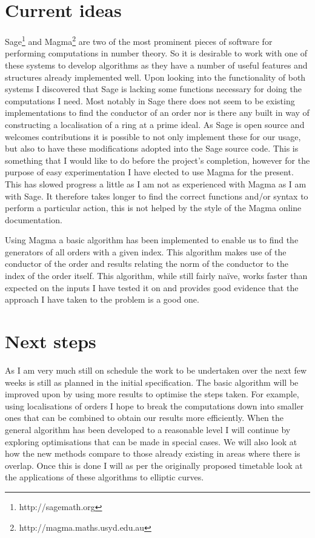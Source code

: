 \documentclass[11pt,a4paper]{article}
\begin{document}
\section*{Current ideas}
Sage\footnote{http://sagemath.org} and Magma\footnote{http://magma.maths.usyd.edu.au} are two of the most prominent pieces of software for performing computations in number theory.
So it is desirable to work with one of these systems to develop algorithms as they have a number of useful features and structures already implemented well.
Upon looking into the functionality of both systems I discovered that Sage is lacking some functions necessary for doing the computations I need.
Most notably in Sage there does not seem to be existing implementations to find the conductor of an order nor is there any built in way of constructing a localisation of a ring at a prime ideal.
As Sage is open source and welcomes contributions it is possible to not only implement these for our usage, but also to have these modifications adopted into the Sage source code.
This is something that I would like to do before the project's completion, however for the purpose of easy experimentation I have elected to use Magma for the present.
This has slowed progress a little as I am not as experienced with Magma as I am with Sage.
It therefore takes longer to find the correct functions and/or syntax to perform a particular action, this is not helped by the style of the Magma online documentation.

Using Magma a basic algorithm has been implemented to enable us to find the generators of all orders with a given index.
This algorithm makes use of the conductor of the order and results relating the norm of the conductor to the index of the order itself.
This algorithm, while still fairly na\"ive, works faster than expected on the inputs I have tested it on and provides good evidence that the approach I have taken to the problem is a good one.

\section*{Next steps}
As I am very much still on schedule the work to be undertaken over the next few weeks is still as planned in the initial specification.
The basic algorithm will be improved upon by using more results to optimise the steps taken.
For example, using localisations of orders I hope to break the computations down into smaller ones that can be combined to obtain our results more efficiently.
When the general algorithm has been developed to a reasonable level I will continue by exploring optimisations that can be made in special cases.
We will also look at how the new methods compare to those already existing in areas where there is overlap.
Once this is done I will as per the originally proposed timetable look at the applications of these algorithms to elliptic curves.
\end{document}
